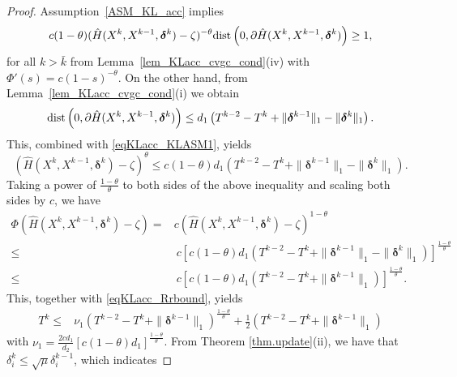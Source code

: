 \documentclass[twoside,11pt]{article}
\numberwithin{equation}{section}
\begin{document}
\begin{proof}
 Assumption~\ref{ASM_KL_acc}  implies
 \begin{equation} \label{eqKLacc_KLASM1}
   c (1-\theta) (\hat{H} (X^{k},X^{k-1},\bm{\delta}^{k})-\zeta)^{-\theta} {\rm dist}\left(0,\partial \hat{H} (X^{k},X^{k-1},\bm{\delta}^{k})\right)\ge 1,
   \end{equation}
 for all $k>\bar{k} $ from Lemma~\ref{lem_KLacc_cvgc_cond}(iv) with $\Phi{'} (s)=c (1-s)^{-\theta} $.
 On the other hand, from Lemma~\ref{lem_KLacc_cvgc_cond}(i) we obtain %
 \begin{equation}
   {\rm dist}\left( 0, \partial \hat{H} (X^{k}, X^{k-1}, \bm{\delta}^{k} ) \right)  \le d_{1}  \left(T^{k-2}-T^{k}+ \|\bm{\delta}^{k-1}\|_{1}-\|\bm{\delta}^{k}\|_{1} \right).
 \end{equation}   
 This, combined with \eqref{eqKLacc_KLASM1}, yields
 \begin{equation}\label{ineq_KLacc_power_sk}
    (\hat{H} (X^{k},X^{k-1},\bm{\delta}^{k})-\zeta)^{\theta} \le c (1-\theta)d_{1}  \left( T^{k-2}-T^{k}+\|\bm{\delta}^{k-1}\|_{1}-\|\bm{\delta}^{k}\|_{1}\right).
 \end{equation}
 Taking a power of $\frac{1-\theta}{\theta} $ to both sides of the above inequality and scaling both sides by $c $, we have 
 \begin{equation}
   \begin{aligned}
     \Phi (\hat{H} (X^{k},X^{k-1},\bm{\delta}^{k})-\zeta) =& c (\hat{H} (X^{k},X^{k-1},\bm{\delta}^{k})-\zeta)^{1-\theta} \\
    \le&\ c\left[c (1-\theta)d_{1}  \left(T^{k-2}-T^{k}+\|\bm{\delta}^{k-1}\|_{1}-\|\bm{\delta}^{k}\|_{1} \right)\right]^{\frac{1-\theta}{\theta}}\\
    \le&\ c\left[c (1-\theta)d_{1}  \left(T^{k-2}-T^{k}+\|\bm{\delta}^{k-1}\|_{1}\right)\right]^{\frac{1-\theta}{\theta}}.  
  \end{aligned} \end{equation}
  This, together with  \eqref{eqKLacc_Rrbound}, yields 
  \begin{equation}\label{KLacc_obj_uppersk}
    \begin{aligned}
     T^{k}\le& \nu_{1} \left(T^{k-2}-T^{k}+\|\bm{\delta}^{k-1}\|_{1}\right)^{\frac{1-\theta}{\theta}} +
     \frac{1}{2} \left(T^{k-2}-T^{k}+\|\bm{\delta}^{k-1}\|_{1}\right)
    \end{aligned}\end{equation}
  with $\nu_{1} = \frac{2cd_{1}}{d_{2}} [c (1-\theta)d_{1}]^{\frac{1-\theta}{\theta}} $.
  From Theorem \ref{thm.update}(ii),  we have that $ \delta_{i}^{k}\le\sqrt{\mu} \delta_{i}^{k-1} $,  which indicates 

\end{proof}
\end{document}
